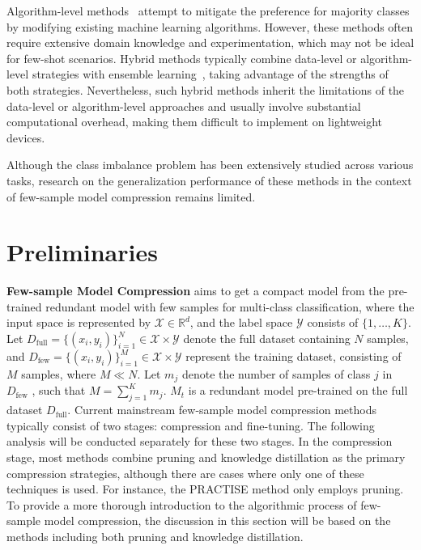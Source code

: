 \documentclass[twoside,11pt]{article}
\begin{document}
Algorithm-level methods~\citep{zhou2005training,fernandez2018cost,he2024multi} attempt to mitigate the preference for majority classes by modifying existing machine learning algorithms. However, these methods often require extensive domain knowledge and experimentation, which may not be ideal for few-shot scenarios. Hybrid methods typically combine data-level or algorithm-level strategies with ensemble learning~\citep{galar2011review,chawla2003smoteboost}, taking advantage of the strengths of both strategies. Nevertheless, such hybrid methods inherit the limitations of the data-level or algorithm-level approaches and usually involve substantial computational overhead, making them difficult to implement on lightweight devices.

Although the class imbalance problem has been extensively studied across various tasks, research on the generalization performance of these methods in the context of few-sample model compression remains limited.

\section{Preliminaries}

\textbf{Few-sample Model Compression} aims to get a compact model from the pre-trained redundant model with few samples for multi-class classification, where the input space is represented by $ \mathcal{X} \in \mathbb{R}^d $, and the label space $ \mathcal{Y} $ consists of $ \{1, \dots, K\} $. Let $ D_{\text{full}} = \{(x_i, y_i)\}_{i=1}^N \in \mathcal{X} \times \mathcal{Y} $ denote the full dataset containing $ N $ samples, and $ D_{\text{few}} = \{(x_i, y_i)\}_{i=1}^M \in \mathcal{X} \times \mathcal{Y} $ represent the training dataset, consisting of $ M $ samples, where $ M \ll N $. Let $ m_j $ denote the number of samples of class $ j $ in $D_{\text{few}}$ , such that $ M = \sum_{j=1}^K m_j $. $ M_t $ is a redundant model pre-trained on the full dataset $ D_{\text{full}} $. 
Current mainstream few-sample model compression methods typically consist of two stages: compression and fine-tuning. The following analysis will be conducted separately for these two stages. In the compression stage, most methods combine pruning and knowledge distillation as the primary compression strategies, although there are cases where only one of these techniques is used. For instance, the PRACTISE method only employs pruning. To provide a more thorough introduction to the algorithmic process of few-sample model compression, the discussion in this section will be based on the methods including both pruning and knowledge distillation.
\end{document}
